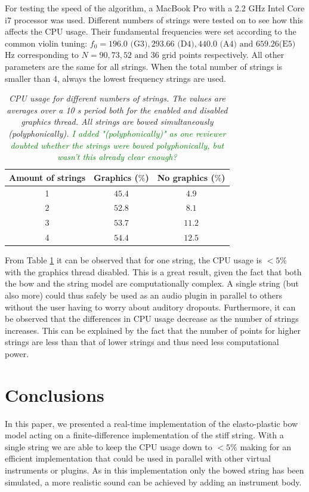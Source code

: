 \documentclass[twoside,a4paper,dvipsnames]{article}
\def\SWcomment[#1]{\textcolor{Green}{#1}}
\begin{document}
For testing the speed of the algorithm, a MacBook Pro with a 2.2 GHz Intel Core i7 processor was used. Different numbers of strings were tested on to see how this affects the CPU usage. Their fundamental frequencies were set according to the common violin tuning: $f_0 = 196.0 \text{ (G3)}, 293.66 \text{ (D4)}, 440.0 \text{ (A4)} \text{ and }659.26\allowbreak \text{(E5)}$ Hz corresponding to $N = 90, 73, 52\text{ and }36$ grid points respectively. All other parameters are the same for all strings. When the total number of strings is smaller than 4, always the lowest frequency strings are used.
\begin{table}[h]
  \caption{{\it CPU usage for different numbers of strings. The values are averages over a 10 s period both for the enabled and disabled graphics thread. All strings are bowed simultaneously (polyphonically). \SWcomment[I added "(polyphonically)" as one reviewer doubted whether the strings were bowed polyphonically, but wasn't this already clear enough?]}}
	\centering
  \begin{tabular}{|c|c|c|}\hline
    Amount of strings & Graphics ($\%$) & No graphics ($\%$)\\ \hline
    
    1 & $45.4$ & $4.9$\\
    2 & $52.8$ & $8.1$\\
    3 & $53.7$ & $11.2$\\
    4 & $54.4$ & $12.5$\\
    \hline
 \end{tabular}
  \label{tab:results}
\end{table}

From Table \ref{tab:results} it can be observed that for one string, the CPU usage is $<5\%$ with the graphics thread disabled. This is a great result, given the fact that both the bow and the string model are computationally complex. A single string (but also more) could thus safely be used as an audio plugin in parallel to others without the user having to worry about auditory dropouts. Furthermore, it can be observed that the differences in CPU usage decrease as the number of strings increases. This can be explained by the fact that the number of points for higher strings are less than that of lower strings and thus need less computational power.

\section{Conclusions}\label{sec:conclusion}
In this paper, we presented a real-time implementation of the elasto-plastic bow model acting on a finite-difference implementation of the stiff string. With a single string we are able to keep the CPU usage down to $<5\%$ making for an efficient implementation that could be used in parallel with other virtual instruments or plugins. As in this implementation only the bowed string has been simulated, a more realistic sound can be achieved by adding an instrument body.
\end{document}
